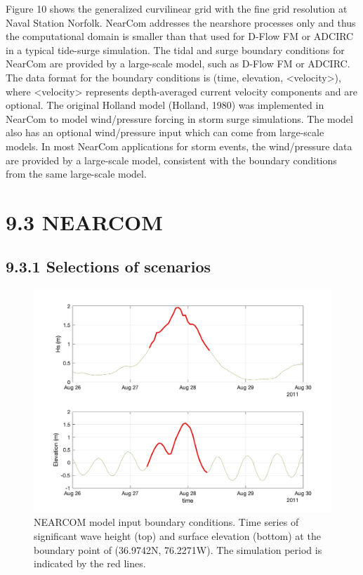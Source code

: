 \documentclass[preprint,12pt,authoryear] {elsarticle}
\begin{document}
Figure 10 shows the generalized curvilinear grid with the fine grid resolution at Naval Station Norfolk.
NearCom addresses the nearshore processes only and thus the computational domain is smaller than that used for D-Flow FM or ADCIRC in a typical tide-surge simulation. The tidal and surge boundary conditions for NearCom are provided by a large-scale model, such as D-Flow FM or ADCIRC. The data format for the boundary conditions is (time, elevation, <velocity>), where <velocity> represents depth-averaged current velocity components and are optional.
The original Holland model (Holland, 1980) was implemented in NearCom to model wind/pressure forcing in storm surge simulations. The model also has an optional wind/pressure input which can come from large-scale models. In most NearCom applications for storm events, the wind/pressure data are provided by a large-scale model, consistent with the boundary conditions from the same large-scale model.

\section*{9.3 NEARCOM} 

\subsection*{9.3.1 Selections of scenarios}


\begin{figure}
\centering
\includegraphics[width=\textwidth]{./figures/nearcom_wave_flow.jpg}
\caption{NEARCOM model input boundary conditions. Time series of significant wave height (top) and surface elevation (bottom) at the boundary point of (36.9742N, 76.2271W). The simulation period is indicated by the red lines. }
\label{ERA5_time}
\centering
\end{figure}
\end{document}
